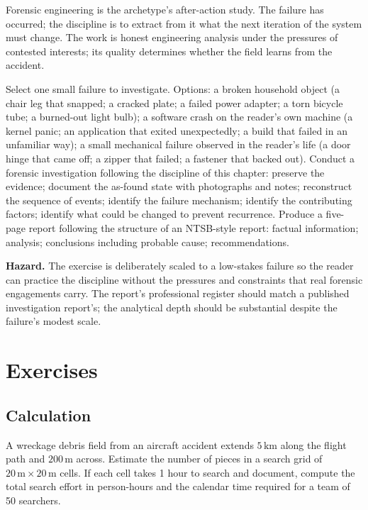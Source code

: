 \begin{archetype}[failure]
Forensic engineering is the archetype's after-action study. The failure has occurred; the discipline is to extract from it what the next iteration of the system must change. The work is honest engineering analysis under the pressures of contested interests; its quality determines whether the field learns from the accident.
\end{archetype}

\begin{project}
Select one small failure to investigate. Options: a broken household object (a chair leg that snapped; a cracked plate; a failed power adapter; a torn bicycle tube; a burned-out light bulb); a software crash on the reader's own machine (a kernel panic; an application that exited unexpectedly; a build that failed in an unfamiliar way); a small mechanical failure observed in the reader's life (a door hinge that came off; a zipper that failed; a fastener that backed out). Conduct a forensic investigation following the discipline of this chapter: preserve the evidence; document the as-found state with photographs and notes; reconstruct the sequence of events; identify the failure mechanism; identify the contributing factors; identify what could be changed to prevent recurrence. Produce a five-page report following the structure of an NTSB-style report: factual information; analysis; conclusions including probable cause; recommendations.

\textbf{Hazard.} The exercise is deliberately scaled to a low-stakes failure so the reader can practice the discipline without the pressures and constraints that real forensic engagements carry. The report's professional register should match a published investigation report's; the analytical depth should be substantial despite the failure's modest scale.
\end{project}

\section{Exercises}

\subsection*{Calculation}

\begin{exercise}
A wreckage debris field from an aircraft accident extends $5\,\text{km}$ along the flight path and $200\,\text{m}$ across. Estimate the number of pieces in a search grid of $20\,\text{m} \times 20\,\text{m}$ cells. If each cell takes 1 hour to search and document, compute the total search effort in person-hours and the calendar time required for a team of 50 searchers.
\end{exercise}

